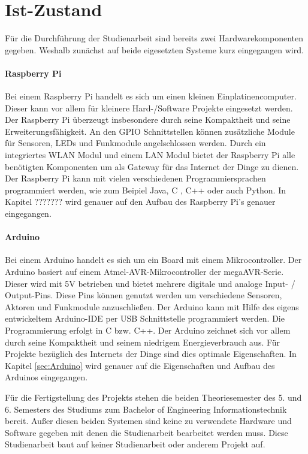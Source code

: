 \section{Ist-Zustand}
\label{sec:IstZustand}
Für die Durchführung der Studienarbeit sind bereits zwei Hardwarekomponenten gegeben. Weshalb zunächst auf beide eigesetzten Systeme kurz eingegangen wird.
\paragraph{Raspberry Pi} 
Bei einem Raspberry Pi handelt es sich um einen kleinen Einplatinencomputer. Dieser kann vor allem für kleinere Hard-/Software Projekte eingesetzt werden. Der Raspberry Pi überzeugt insbesondere durch seine Kompaktheit und seine Erweiterungsfähigkeit. An den \ac{GPIO} Schnittstellen können zusätzliche Module für Sensoren, LEDs und Funkmodule angelschlossen werden.  Durch ein integriertes WLAN Modul und einem LAN Modul bietet der Raspberry Pi alle benötigten Komponenten um als Gateway für das Internet der Dinge zu dienen. Der Raspberry Pi kann mit vielen verschiedenen Programmiersprachen programmiert werden, wie zum Beipiel Java, C , C++ oder auch Python. In Kapitel ??????? wird genauer auf den Aufbau des Raspberry Pi’s genauer eingegangen.  
\paragraph{Arduino} 
Bei einem Arduino handelt es sich um ein Board mit einem Mikrocontroller. Der Arduino basiert auf einem Atmel-AVR-Mikrocontroller der megaAVR-Serie. Dieser wird mit 5V betrieben und bietet mehrere digitale und analoge Input- / Output-Pins.  Diese Pins können genutzt werden um verschiedene Sensoren, Aktoren und Funkmodule anzuschließen. Der Arduino kann mit Hilfe des eigens entwickeltem Arduino-IDE per USB Schnittstelle programmiert werden. Die Programmierung erfolgt in C bzw. C++. Der Arduino zeichnet sich vor allem durch seine Kompaktheit und seinem niedrigem Energieverbrauch aus. Für Projekte bezüglich des Internets der Dinge sind dies optimale  Eigenschaften.   In Kapitel \ref{sec:Arduino} wird genauer auf die Eigenschaften und Aufbau des Arduinos eingegangen.

Für die Fertigstellung des Projekts stehen die beiden Theoriesemester des 5. und 6. Semesters des Studiums zum Bachelor of Engineering Informationstechnik bereit. Außer diesen beiden Systemen sind keine zu verwendete Hardware und Software gegeben mit denen die Studienarbeit bearbeitet werden muss. Diese Studienarbeit baut auf keiner Studienarbeit oder anderem Projekt auf.


